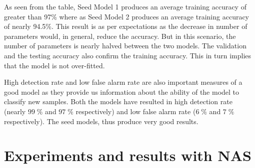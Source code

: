 \begingroup
\setlength{\tabcolsep}{12pt}
\renewcommand{\arraystretch}{1.5}
\begin{table}[ht]
\normalsize
{}
\caption{Comparison of seed model results}
\label{table:seed_model_results}
\end{table}
\endgroup

As seen from the table, Seed Model 1 produces an average training accuracy of greater than 97\% where as Seed Model 2 produces an average training accuracy of nearly 94.5\%. This result is as per expectations as the decrease in number of parameters would, in general, reduce the accuracy. But in this scenario, the number of parameters is nearly halved between the two models. The validation and the testing accuracy also confirm the training accuracy. This in turn implies that the model is not over-fitted. 

High detection rate and low false alarm rate are also important measures of a good model as they provide us information about the ability of the model to classify new samples. Both the models have resulted in high detection rate (nearly $99 \; \% $ and $97 \; \% $ respectively) and low false alarm rate ($ 6 \; \% $ and $7 \; \% $ respectively). The seed models, thus produce very good results. 

\section{Experiments and results with NAS}
\label{sec:nas_experiments}

